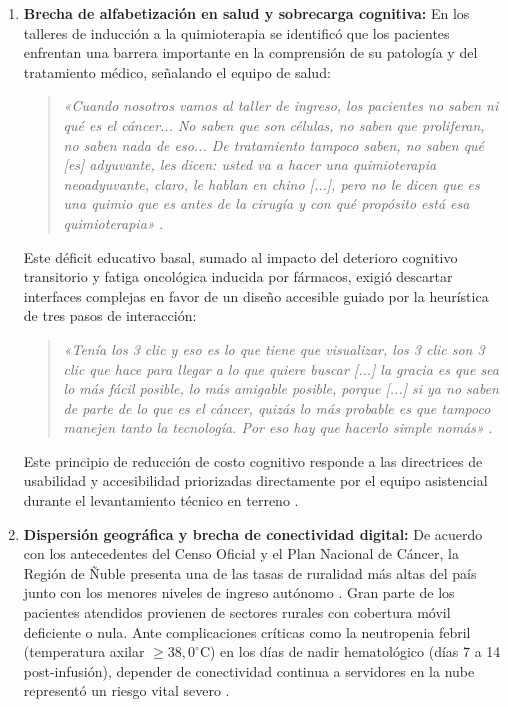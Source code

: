 \begin{enumerate}
    \item \textbf{Brecha de alfabetización en salud y sobrecarga cognitiva:} En los talleres de inducción a la quimioterapia se identificó que los pacientes enfrentan una barrera importante en la comprensión de su patología y del tratamiento médico, señalando el equipo de salud:
    \begin{quote}
        \textit{«Cuando nosotros vamos al taller de ingreso, los pacientes no saben ni qué es el cáncer... No saben que son células, no saben que proliferan, no saben nada de eso... De tratamiento tampoco saben, no saben qué [es] adyuvante, les dicen: usted va a hacer una quimioterapia neoadyuvante, claro, le hablan en chino [...], pero no le dicen que es una quimio que es antes de la cirugía y con qué propósito está esa quimioterapia»} \parencite{entrevistaHCHM2026}.
    \end{quote}
    Este déficit educativo basal, sumado al impacto del deterioro cognitivo transitorio y fatiga oncológica inducida por fármacos, exigió descartar interfaces complejas en favor de un diseño accesible guiado por la heurística de tres pasos de interacción:
    \begin{quote}
        \textit{«Tenía los 3 clic y eso es lo que tiene que visualizar, los 3 clic son 3 clic que hace para llegar a lo que quiere buscar [...] la gracia es que sea lo más fácil posible, lo más amigable posible, porque [...] si ya no saben de parte de lo que es el cáncer, quizás lo más probable es que tampoco manejen tanto la tecnología. Por eso hay que hacerlo simple nomás»} \parencite{entrevistaHCHM2026}.
    \end{quote}
    Este principio de reducción de costo cognitivo responde a las directrices de usabilidad y accesibilidad priorizadas directamente por el equipo asistencial durante el levantamiento técnico en terreno \parencite{entrevistaHCHM2026}.

    \item \textbf{Dispersión geográfica y brecha de conectividad digital:} De acuerdo con los antecedentes del Censo Oficial y el Plan Nacional de Cáncer, la Región de Ñuble presenta una de las tasas de ruralidad más altas del país junto con los menores niveles de ingreso autónomo \parencite{ine2024censo, minsal2022plancancer}. Gran parte de los pacientes atendidos provienen de sectores rurales con cobertura móvil deficiente o nula. Ante complicaciones críticas como la neutropenia febril (temperatura axilar $\ge 38,0^\circ\text{C}$) en los días de nadir hematológico (días 7 a 14 post-infusión), depender de conectividad continua a servidores en la nube representó un riesgo vital severo \parencite{minsal2022plancancer}.


\end{enumerate}

